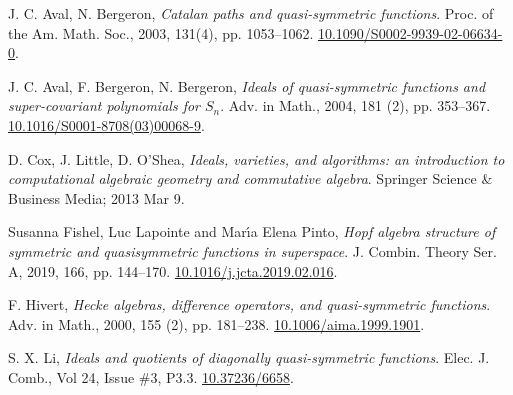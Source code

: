 \documentclass[11pt]{amsart}
\theoremstyle{definition}
\numberwithin{equation}{section}
\begin{document}
\begin{thebibliography}{999}

 J. C. Aval, N. Bergeron,
\textit{Catalan paths and quasi-symmetric functions}.
Proc. of the Am. Math. Soc., 2003, 131(4), pp. 1053--1062.
\href{https://doi.org/10.1090/S0002-9939-02-06634-0}{10.1090/S0002-9939-02-06634-0}.

 J. C. Aval, F. Bergeron, N. Bergeron,
\textit{Ideals of quasi-symmetric functions and super-covariant polynomials for $S_n$}.
Adv. in Math., 2004, 181 (2), pp. 353--367.
\href{https://doi.org/10.1016/S0001-8708(03)00068-9}{10.1016/S0001-8708(03)00068-9}.

 D. Cox, J. Little, D. O'Shea,
\textit{Ideals, varieties, and algorithms: an introduction to computational
algebraic geometry and commutative algebra}.
Springer Science \& Business Media; 2013 Mar 9.

Susanna Fishel, Luc Lapointe and Mar\'{\i}a Elena Pinto,
\textit{Hopf algebra structure of symmetric and quasisymmetric
              functions in superspace}.
 {J. Combin. Theory Ser. A}, 2019, 166, pp.  {144--170}.
\href{https://doi-org/10.1016/j.jcta.2019.02.016}{10.1016/j.jcta.2019.02.016}.

 F. Hivert,
\textit{Hecke algebras, difference operators, and quasi-symmetric
              functions}.
Adv. in Math., 2000, 155 (2), pp. 181--238.
\href{https://doi-org/10.1006/aima.1999.1901}{10.1006/aima.1999.1901}.

 S. X. Li,
\textit{Ideals and quotients of diagonally quasi-symmetric functions}.
Elec. J. Comb., Vol 24, Issue \#3, P3.3.
\href{https://doi.org/10.37236/6658}{10.37236/6658}.
\end{thebibliography}
\end{document}
